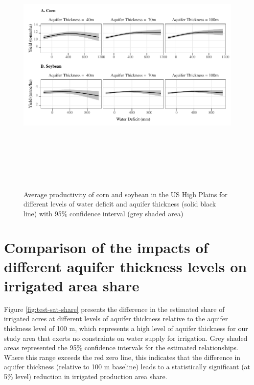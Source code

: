 \documentclass[
]{article}
\begin{document}
\begin{figure}[H]

{\centering \includegraphics[width=6.5in,height=500px,]{../../Figures/g_avg_yield} 

}

\caption{Average productivity of corn and soybean in the US High Plains for different levels of water deficit and aquifer thickness (solid black line) with 95\% confidence interval (grey shaded area)}\label{fig:avg-yield-ind}
\end{figure}

\clearpage

\hypertarget{test-dif-share}{%
\section{Comparison of the impacts of different aquifer thickness levels on irrigated area share}\label{test-dif-share}}

\setcounter{figure}{0}
\renewcommand{\thefigure}{B.\arabic{figure}}

Figure \ref{fig:test-sat-share} presents the difference in the estimated share of irrigated acres at different levels of aquifer thickness relative to the aquifer thickness level of 100 m, which represents a high level of aquifer thickness for our study area that exerts no constraints on water supply for irrigation. Grey shaded areas represented the 95\% confidence intervals for the estimated relationships. Where this range exceeds the red zero line, this indicates that the difference in aquifer thickness (relative to 100 m baseline) leads to a statistically significant (at 5\% level) reduction in irrigated production area share. 
\end{document}
